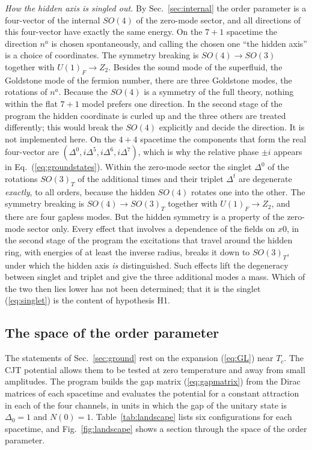 \emph{How the hidden axis is singled out.} By Sec.~\ref{sec:internal} the order parameter is a
four-vector of the internal $SO(4)$ of the zero-mode sector, and all directions of this four-vector
have exactly the same energy.
On the $7+1$ spacetime the direction $n^a$ is chosen spontaneously, and calling the chosen one ``the
hidden axis'' is a choice of coordinates. The symmetry breaking is $SO(4)\to SO(3)$ together with
$U(1)_F\to Z_2$. Besides the sound mode of the superfluid, the Goldstone mode of the fermion number,
there are three Goldstone modes, the rotations of $n^a$. Because the $SO(4)$ is a symmetry of the full
theory, nothing within the flat $7+1$ model prefers one direction. In the second stage of the program
the hidden coordinate is curled up and the three others are treated differently; this would break the
$SO(4)$ explicitly and decide the direction. It is not implemented here.
On the $4+4$ spacetime the components that form the real four-vector are
$(\Delta^0,i\Delta^5,i\Delta^6,i\Delta^7)$, which is why the relative phase $\pm i$ appears in
Eq.~(\ref{eq:groundstates}). Within the zero-mode sector the singlet $\Delta^0$ of the rotations
$SO(3)_T$ of the additional times and their triplet $\Delta^t$ are degenerate \emph{exactly}, to all
orders, because the hidden $SO(4)$ rotates one into the other. The symmetry breaking is
$SO(4)\to SO(3)_T$ together with $U(1)_F\to Z_2$, and there are four gapless modes. But the hidden
symmetry is a property of the zero-mode sector only. Every effect that involves a dependence of the
fields on $x0$, in the second stage of the program the excitations that travel around the hidden
ring, with energies of at least the inverse radius, breaks it down to $SO(3)_T$, under which the
hidden axis \emph{is} distinguished. Such effects lift the degeneracy between singlet and triplet and
give the three additional modes a mass. Which of the two then lies lower has not been determined;
that it is the singlet (\ref{eq:singlet}) is the content of hypothesis H1.

\subsection{The space of the order parameter}
\label{sec:landscape}

The statements of Sec.~\ref{sec:ground} rest on the expansion (\ref{eq:GL}) near $T_c$. The CJT
potential allows them to be tested at zero temperature and away from small amplitudes. The program
builds the gap matrix (\ref{eq:gapmatrix}) from the Dirac matrices of each spacetime and evaluates the
potential for a constant attraction in each of the four channels, in units in which the gap of the
unitary state is $\Delta_0=1$ and $N(0)=1$. Table~\ref{tab:landscape} lists six configurations for
each spacetime, and Fig.~\ref{fig:landscape} shows a section through the space of the order
parameter.

